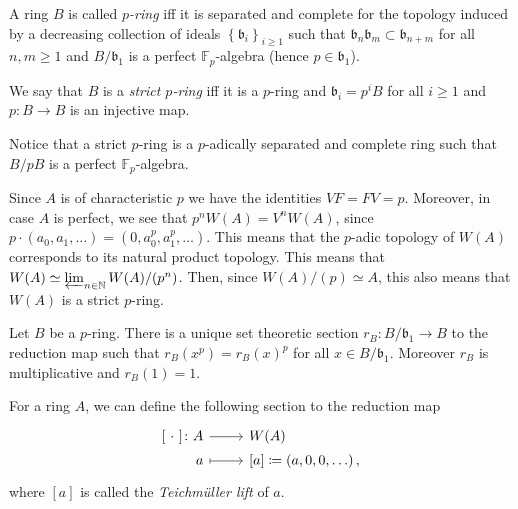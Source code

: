 \begin{defn}
	A ring $B$ is called {\em $p$-ring} iff it is separated and complete
	for the topology induced by a decreasing collection of ideals
	$\left\{ \mathfrak{b}_i \right\}_{i \geq 1}$ such that 
	$\mathfrak{b}_n \mathfrak{b}_m \subset \mathfrak{b}_{n+m}$
	for all $n,m \geq 1$
	and $B/\mathfrak{b}_1$ is a perfect $\mathbb{F}_p$-algebra
	(hence $p \in \mathfrak{b}_1$).

	We say that $B$ is a {\em strict $p$-ring} iff it is a $p$-ring
	and $\mathfrak{b}_i = p^iB$ for all $i \geq 1$
	and $p\colon B \to B$ is an injective map.
\end{defn}


\begin{rem}[]
	Notice that a strict $p$-ring is a $p$-adically separated and complete
	ring such that $B/pB$ is a perfect $\mathbb{F}_p$-algebra.
\end{rem}


\begin{rem}[]
	Since $A$ is of characteristic $p$ we have the identities
	$VF = FV = p$.
	Moreover, in case $A$ is perfect, we see that $p^nW(A) = V^nW(A)$,
	since $p \cdot \left( a_0, a_1, \ldots \right) =
	(0, a_0^p, a_1^p, \ldots)$.
	This means that the $p$-adic topology of $W(A)$ corresponds
	to its natural product topology.
	This means that $W(A) \simeq \varprojlim_{n \in \mathbb{N}} W(A)/ (p^n)$.
	Then, since $W(A)/ (p) \simeq A$, this also means that $W(A)$ is a strict $p$-ring.
\end{rem}


\begin{lem}\label{pRingSection}
	Let $B$ be a $p$-ring.
	There is a unique set theoretic section
	$r_B\colon B/\mathfrak{b}_1 \to B$
	to the reduction map such that
	$r_B(x^p) = r_B(x)^p$
	for all $x \in B/\mathfrak{b}_1$.
	Moreover $r_B$ is multiplicative and $r_B(1) = 1$.
\end{lem} 


\begin{defn}
	For a ring $A$, we can define the following section to the reduction map
	\begin{equation*}
	\begin{tikzcd}[row sep = 0ex
		,/tikz/column 1/.append style={anchor=base east}
		,/tikz/column 2/.append style={anchor=base west}]
		[\ \cdot \ ]\colon A \arrow[r, "", rightarrow] &
		W(A) \\
		a \arrow[r, "", mapsto] &
		[a] [a] \coloneqq \left( a, 0, 0, \ldots \right)
	,\end{tikzcd}
	\end{equation*} 
	where $[a]$ is called the {\em Teichmüller lift} of $a$.
\end{defn}



